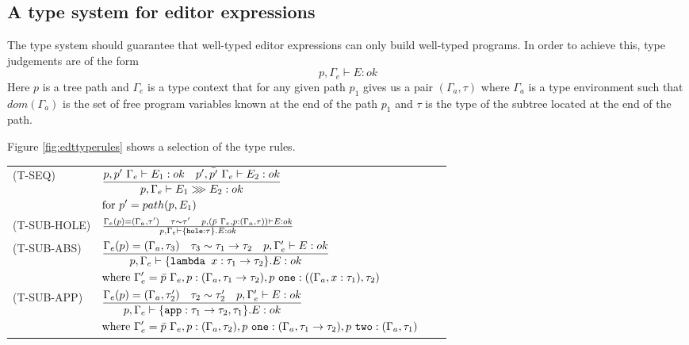 \subsection{A type system for editor expressions}

The type system should guarantee that well-typed editor expressions
can only build well-typed programs. In order to achieve this, type
judgements are of the form
%
\[ p,\Gamma_e \vdash E : ok \]
%
Here $p$ is a tree path and $\Gamma_e$ is a type context that for any
given path $p_1$ gives us a pair $(\Gamma_a,\tau)$
where $\Gamma_a$ is a type environment such that $dom(\Gamma_a)$ is
the set of free program variables known at the end of the path $p_1$
and $\tau$ is the type of the subtree located at the end of the path.

Figure \ref{fig:edttyperules} shows a selection of the type rules.

\begin{figure*}
  \center
  \renewcommand{\arraystretch}{2}
  \begin{tabular}{llll}
    \scriptsize(T-SEQ)       & \scriptsize$\TSeq$ & &\\
    \scriptsize(T-SUB-HOLE)  & $\TSubHole$ & &           \\
    \scriptsize(T-SUB-ABS)   & \scriptsize$\TSubAbs$   & & \\
    \scriptsize(T-SUB-APP)   & \scriptsize$ \TSubApp$ & & \\
  \end{tabular}
  \caption{Selected type rules for editor expressions}
  \label{fig:edttyperules}
\end{figure*}

